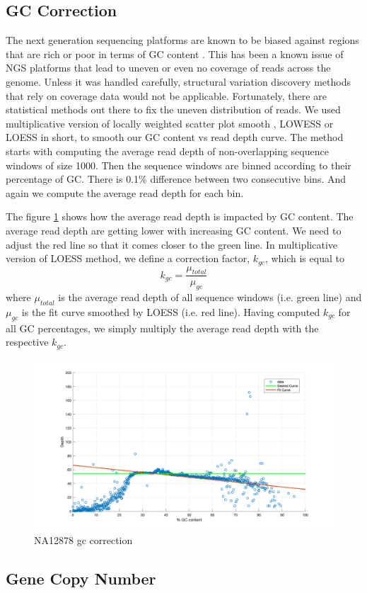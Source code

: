 \subsection{GC Correction}
The next generation sequencing platforms are known to be biased against regions that are rich or poor in terms of GC content \cite{smith2008rapid}. This has been a known issue of NGS platforms that lead to uneven or even no coverage of reads across the genome. Unless it was handled carefully, structural variation discovery methods that rely on coverage data would not be applicable. Fortunately, there are statistical methods out there to fix the uneven distribution of reads. We used multiplicative version of locally weighted scatter plot smooth \cite{cleveland1991computational}, LOWESS or LOESS in short, to smooth our GC content vs read depth curve. The method starts with computing the average read depth of non-overlapping sequence windows of size 1000. Then the sequence windows are binned according to their percentage of GC. There is 0.1\% difference between two consecutive bins. And again we compute the average read depth for each bin.

The figure \ref{gcCorrection} shows how the average read depth is impacted by GC content. The average read depth are getting lower with increasing GC content. We need to adjust the red line so that it comes closer to the green line. In multiplicative version of LOESS method, we define a correction factor, $k_{gc}$, which is equal to $$k_{gc} = \frac{\mu_{total}}{\mu_{gc}}$$ where $\mu_{total}$ is the average read depth of all sequence windows (i.e. green line) and $\mu_{gc}$ is the fit curve smoothed by LOESS (i.e. red line). Having computed $k_{gc}$ for all GC percentages, we simply multiply the average read depth with the respective $k_{gc}$.
\begin{figure}[ht]
    \centering
    \includegraphics[scale=0.25]{images/gcCorrection.png}
    \caption{NA12878 gc correction}
    \label{gcCorrection}
\end{figure}

\subsection{Gene Copy Number}